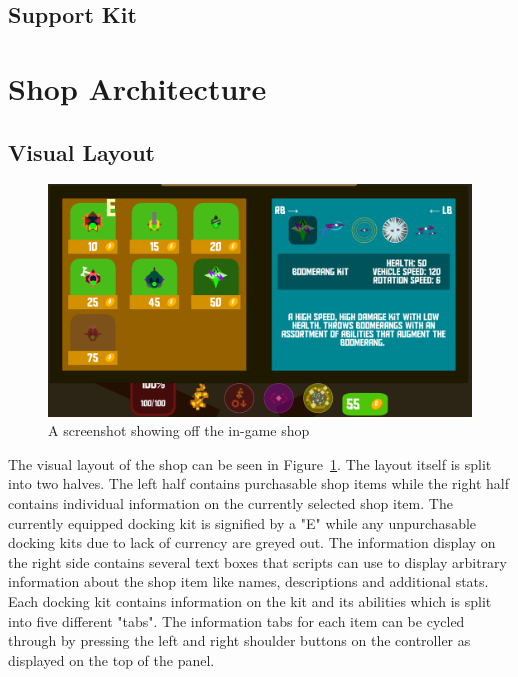 \subsection{Support Kit}

\section{Shop Architecture}
\subsection{Visual Layout}
\begin{figure}[tbph]  %
  \centering
  \includegraphics[width=.75\textwidth]{images/shopOverview}
  \caption[Screenshot showing off the in-game shop]{A screenshot showing off the in-game shop}
  \label{fig:shopOverview}
\end{figure}

The visual layout of the shop can be seen in Figure~\ref{fig:shopOverview}. The layout itself is split into two halves. 
The left half contains purchasable shop items while the right half contains individual information on the currently selected shop item. The currently equipped docking kit is signified by a "E" while any unpurchasable docking kits due to lack of currency are greyed out. 
The information display on the right side contains several text boxes that scripts can use to display arbitrary information about the shop item like names, descriptions and additional stats. Each docking kit contains information on the kit and its abilities which is split into five different "tabs". The information tabs for each item can be cycled through by pressing the left and right shoulder buttons on the controller as displayed on the top of the panel.

